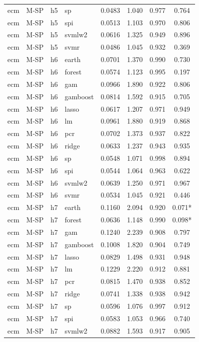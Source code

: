 \begin{ThreePartTable}
\begin{longtable}[t]{llclcccc}
ecm & M-SP & h5 & sp & 0.0483 & 1.040 & 0.977 & 0.764\\
ecm & M-SP & h5 & spi & 0.0513 & 1.103 & 0.970 & 0.806\\
ecm & M-SP & h5 & svmlw2 & 0.0616 & 1.325 & 0.949 & 0.896\\
ecm & M-SP & h5 & svmr & 0.0486 & 1.045 & 0.932 & 0.369\\
\addlinespace
ecm & M-SP & h6 & earth & 0.0701 & 1.370 & 0.990 & 0.730\\
ecm & M-SP & h6 & forest & 0.0574 & 1.123 & 0.995 & 0.197\\
ecm & M-SP & h6 & gam & 0.0966 & 1.890 & 0.922 & 0.806\\
ecm & M-SP & h6 & gamboost & 0.0814 & 1.592 & 0.915 & 0.705\\
ecm & M-SP & h6 & lasso & 0.0617 & 1.207 & 0.971 & 0.949\\
ecm & M-SP & h6 & lm & 0.0961 & 1.880 & 0.919 & 0.868\\
ecm & M-SP & h6 & pcr & 0.0702 & 1.373 & 0.937 & 0.822\\
ecm & M-SP & h6 & ridge & 0.0633 & 1.237 & 0.943 & 0.935\\
ecm & M-SP & h6 & sp & 0.0548 & 1.071 & 0.998 & 0.894\\
ecm & M-SP & h6 & spi & 0.0544 & 1.064 & 0.963 & 0.622\\
ecm & M-SP & h6 & svmlw2 & 0.0639 & 1.250 & 0.971 & 0.967\\
ecm & M-SP & h6 & svmr & 0.0534 & 1.045 & 0.921 & 0.446\\
\addlinespace
ecm & M-SP & h7 & earth & 0.1160 & 2.094 & 0.920 & 0.071*\\
ecm & M-SP & h7 & forest & 0.0636 & 1.148 & 0.990 & 0.098*\\
ecm & M-SP & h7 & gam & 0.1240 & 2.239 & 0.908 & 0.797\\
ecm & M-SP & h7 & gamboost & 0.1008 & 1.820 & 0.904 & 0.749\\
ecm & M-SP & h7 & lasso & 0.0829 & 1.498 & 0.931 & 0.948\\
ecm & M-SP & h7 & lm & 0.1229 & 2.220 & 0.912 & 0.881\\
ecm & M-SP & h7 & pcr & 0.0815 & 1.470 & 0.938 & 0.852\\
ecm & M-SP & h7 & ridge & 0.0741 & 1.338 & 0.938 & 0.942\\
ecm & M-SP & h7 & sp & 0.0596 & 1.076 & 0.997 & 0.912\\
ecm & M-SP & h7 & spi & 0.0583 & 1.053 & 0.966 & 0.740\\
ecm & M-SP & h7 & svmlw2 & 0.0882 & 1.593 & 0.917 & 0.905\\

\end{longtable}
\end{ThreePartTable}
